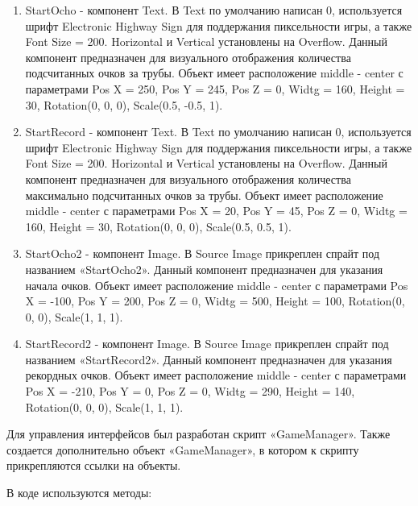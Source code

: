 \documentclass[14pt, oneside]{altsu-report}
\begin{document}
\begin{enumerate}
\item StartOcho - компонент Text. В Text по умолчанию написан 0, используется шрифт Electronic Highway Sign для поддержания пиксельности игры, а также Font Size = 200. Horizontal и Vertical установлены на Overflow. Данный компонент предназначен для визуального отображения количества подсчитанных очков за трубы. Объект имеет расположение middle - center с параметрами Pos X = 250, Pos Y = 245, Pos Z = 0, Widtg = 160, Height = 30, Rotation(0, 0, 0), Scale(0.5, -0.5, 1).
\item StartRecord - компонент Text. В Text по умолчанию написан 0, используется шрифт Electronic Highway Sign для поддержания пиксельности игры, а также Font Size = 200. Horizontal и Vertical установлены на Overflow. Данный компонент предназначен для визуального отображения количества максимально подсчитанных очков за трубы. Объект имеет расположение middle - center с параметрами Pos X = 20, Pos Y = 45, Pos Z = 0, Widtg = 160, Height = 30, Rotation(0, 0, 0), Scale(0.5, 0.5, 1).
\item StartOcho2 - компонент Image. В Source Image прикреплен спрайт под названием «StartOcho2». Данный компонент предназначен для указания начала очков. Объект имеет расположение middle - center с параметрами Pos X = -100, Pos Y = 200, Pos Z = 0, Widtg = 500, Height = 100, Rotation(0, 0, 0), Scale(1, 1, 1). 
\item StartRecord2 - компонент Image. В Source Image прикреплен спрайт под названием «StartRecord2». Данный компонент предназначен для указания рекордных очков. Объект имеет расположение middle - center с параметрами Pos X = -210, Pos Y = 0, Pos Z = 0, Widtg = 290, Height = 140, Rotation(0, 0, 0), Scale(1, 1, 1). 

\end{enumerate} 

Для управления интерфейсов был разработан скрипт «GameManager». Также создается дополнительно объект «GameManager», в котором к скрипту прикрепляются ссылки на объекты. 

В коде используются методы:
\end{document}
